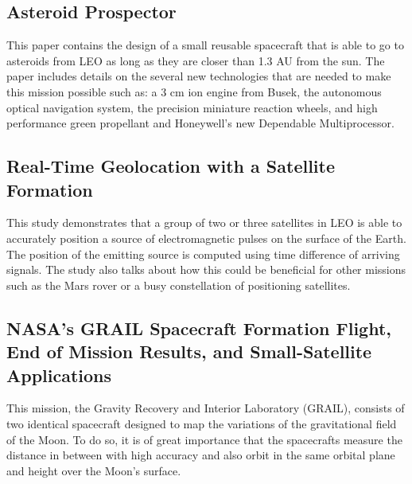 \subsection{Asteroid Prospector}

This paper contains the design of a small reusable spacecraft that
is able to go to asteroids from LEO as long as they are closer than
1.3 AU from the sun. The paper includes details on the several new
technologies that are needed to make this mission possible such as:
a 3 cm ion engine from Busek, the autonomous optical navigation system,
the precision miniature reaction wheels, and high performance green
propellant and Honeywell's new Dependable Multiprocessor.\cite{Muelle_AsteroidProspector}

\subsection{Real-Time Geolocation with a Satellite Formation}

This study demonstrates that a group of two or three satellites in
LEO is able to accurately position a source of electromagnetic pulses
on the surface of the Earth. The position of the emitting source is
computed using time difference of arriving signals. The study also
talks about how this could be beneficial for other missions such as
the Mars rover or a busy constellation of positioning satellites.\cite{Leiter_Geoloc}

\subsection{NASA\textquoteright{}s GRAIL Spacecraft Formation Flight, End of Mission Results, and Small-Satellite Applications}

This mission, the Gravity Recovery and Interior Laboratory (GRAIL),
consists of two identical spacecraft designed to map the variations
of the gravitational field of the Moon. To do so, it is of great importance
that the spacecrafts measure the distance in between with high accuracy
and also orbit in the same orbital plane and height over the Moon's
surface.\cite{Edward_GRAIL}
